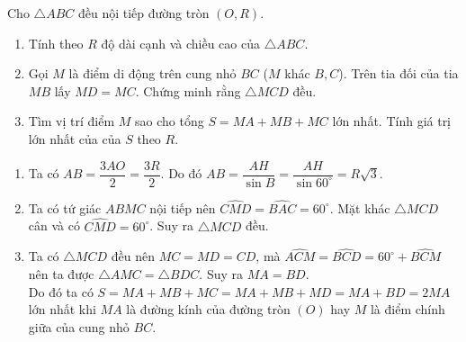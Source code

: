 \begin{ex}%
	Cho $\triangle ABC$ đều nội tiếp đường tròn $(O,R)$.
	\begin{enumerate}
		\item Tính theo $R$ độ dài cạnh và chiều cao của $\triangle ABC$.
		\item Gọi $M$ là điểm di động trên cung nhỏ $BC$ ($M$ khác $B,C$). Trên tia đối của tia $MB$ lấy $MD=MC$. Chứng minh rằng $\triangle MCD$ đều.
		\item Tìm vị trí điểm $M$ sao cho tổng $S=MA+MB+MC$ lớn nhất. Tính giá trị lớn nhất của của $S$ theo $R$.
	\end{enumerate}
	\loigiai
	{	\begin{center}
		\end{center}
	\begin{enumerate}
		\item Ta có $AB=\dfrac{3AO}{2}=\dfrac{3R}{2}$. 
		Do đó $AB=\dfrac{AH}{\sin B}=\dfrac{AH}{\sin 60^\circ}=R\sqrt{3}.$
		\item Ta có tứ giác $ABMC$ nội tiếp nên $\widehat{CMD}=\widehat{BAC}=60^\circ$. Mặt khác $\triangle MCD$ cân và có $\widehat{CMD}=60^\circ$. Suy ra $\triangle MCD$ đều.
		\item Ta có $\triangle MCD$ đều nên $MC=MD=CD$, mà $\widehat{ACM}=\widehat{BCD}=60^\circ+\widehat{BCM}$ nên ta được $\triangle AMC=\triangle BDC$. Suy ra $MA=BD$. \\Do đó ta có $S=MA+MB+MC=MA+MB+MD=MA+BD=2MA$ lớn nhất khi $MA$ là đường kính của đường tròn $(O)$ hay $M$ là điểm chính giữa của cung nhỏ $BC$.
	\end{enumerate}	
	}
\end{ex}

